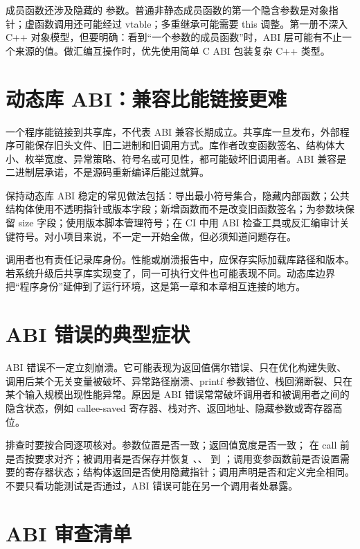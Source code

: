 成员函数还涉及隐藏的  参数。普通非静态成员函数的第一个隐含参数是对象指针；虚函数调用还可能经过 vtable；多重继承可能需要 this 调整。第一册不深入 C++ 对象模型，但要明确：看到“一个参数的成员函数”时，ABI 层可能有不止一个来源的值。做汇编互操作时，优先使用简单 C ABI 包装复杂 C++ 类型。

\section{动态库 ABI：兼容比能链接更难}

一个程序能链接到共享库，不代表 ABI 兼容长期成立。共享库一旦发布，外部程序可能保存旧头文件、旧二进制和旧调用方式。库作者改变函数签名、结构体大小、枚举宽度、异常策略、符号名或可见性，都可能破坏旧调用者。ABI 兼容是二进制层承诺，不是源码重新编译后能过就算。

保持动态库 ABI 稳定的常见做法包括：导出最小符号集合，隐藏内部函数；公共结构体使用不透明指针或版本字段；新增函数而不是改变旧函数签名；为参数块保留 size 字段；使用版本脚本管理符号；在 CI 中用 ABI 检查工具或反汇编审计关键符号。对小项目来说，不一定一开始全做，但必须知道问题存在。

调用者也有责任记录库身份。性能或崩溃报告中，应保存实际加载库路径和版本。若系统升级后共享库实现变了，同一可执行文件也可能表现不同。动态库边界把“程序身份”延伸到了运行环境，这是第一章和本章相互连接的地方。

\section{ABI 错误的典型症状}

ABI 错误不一定立刻崩溃。它可能表现为返回值偶尔错误、只在优化构建失败、调用后某个无关变量被破坏、异常路径崩溃、printf 参数错位、栈回溯断裂、只在某个输入规模出现性能异常。原因是 ABI 错误常常破坏调用者和被调用者之间的隐含状态，例如 callee-saved 寄存器、栈对齐、返回地址、隐藏参数或寄存器高位。

排查时要按合同逐项核对。参数位置是否一致；返回值宽度是否一致； 在 call 前是否按要求对齐；被调用者是否保存并恢复 、、 到 ；调用变参函数前是否设置需要的寄存器状态；结构体返回是否使用隐藏指针；调用声明是否和定义完全相同。不要只看功能测试是否通过，ABI 错误可能在另一个调用者处暴露。

\section{ABI 审查清单}

